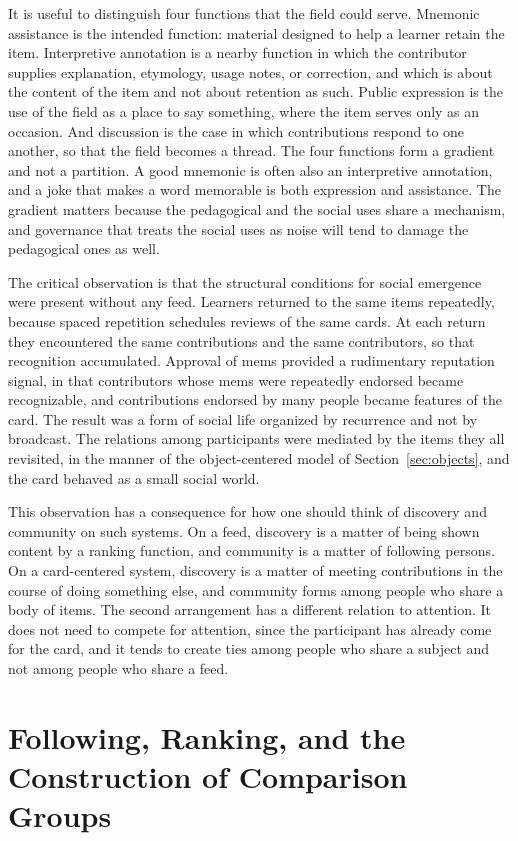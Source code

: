 \documentclass[11pt]{article}
\theoremstyle{remark}
\begin{document}
It is useful to distinguish four functions that the field could serve. Mnemonic assistance is the intended function: material designed to help a learner retain the item. Interpretive annotation is a nearby function in which the contributor supplies explanation, etymology, usage notes, or correction, and which is about the content of the item and not about retention as such. Public expression is the use of the field as a place to say something, where the item serves only as an occasion. And discussion is the case in which contributions respond to one another, so that the field becomes a thread. The four functions form a gradient and not a partition. A good mnemonic is often also an interpretive annotation, and a joke that makes a word memorable is both expression and assistance. The gradient matters because the pedagogical and the social uses share a mechanism, and governance that treats the social uses as noise will tend to damage the pedagogical ones as well.

The critical observation is that the structural conditions for social emergence were present without any feed. Learners returned to the same items repeatedly, because spaced repetition schedules reviews of the same cards. At each return they encountered the same contributions and the same contributors, so that recognition accumulated. Approval of mems provided a rudimentary reputation signal, in that contributors whose mems were repeatedly endorsed became recognizable, and contributions endorsed by many people became features of the card. The result was a form of social life organized by recurrence and not by broadcast. The relations among participants were mediated by the items they all revisited, in the manner of the object-centered model of Section~\ref{sec:objects}, and the card behaved as a small social world.

This observation has a consequence for how one should think of discovery and community on such systems. On a feed, discovery is a matter of being shown content by a ranking function, and community is a matter of following persons. On a card-centered system, discovery is a matter of meeting contributions in the course of doing something else, and community forms among people who share a body of items. The second arrangement has a different relation to attention. It does not need to compete for attention, since the participant has already come for the card, and it tends to create ties among people who share a subject and not among people who share a feed.

\section{Following, Ranking, and the Construction of Comparison Groups}
\end{document}
